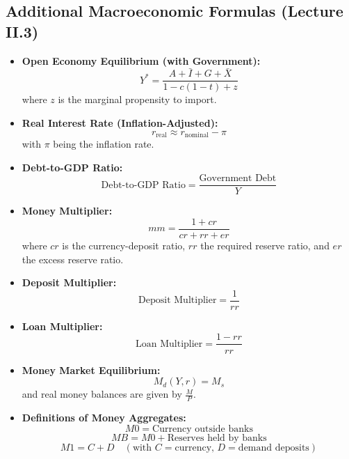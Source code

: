 \subsection*{Additional Macroeconomic Formulas (Lecture II.3)}
\begin{itemize}
    \item \textbf{Open Economy Equilibrium (with Government):}
    \[
    Y^* = \frac{A + \bar{I} + G + \bar{X}}{1 - c(1-t) + z}
    \]
    where \(z\) is the marginal propensity to import.
    \item \textbf{Real Interest Rate (Inflation-Adjusted):}
    \[
    r_{\text{real}} \approx r_{\text{nominal}} - \pi
    \]
    with \(\pi\) being the inflation rate.
    \item \textbf{Debt-to-GDP Ratio:}
    \[
    \text{Debt-to-GDP Ratio} = \frac{\text{Government Debt}}{Y}
    \]
    \item \textbf{Money Multiplier:}
    \[
    mm = \frac{1 + cr}{cr + rr + er}
    \]
    where \(cr\) is the currency-deposit ratio, \(rr\) the required reserve ratio, and \(er\) the excess reserve ratio.
    \item \textbf{Deposit Multiplier:}
    \[
    \text{Deposit Multiplier} = \frac{1}{rr}
    \]
    \item \textbf{Loan Multiplier:}
    \[
    \text{Loan Multiplier} = \frac{1 - rr}{rr}
    \]
    \item \textbf{Money Market Equilibrium:}
    \[
    M_d(Y, r) = M_s
    \]
    and real money balances are given by \(\frac{M}{P}\).
    \item \textbf{Definitions of Money Aggregates:}
    \[
    M0 = \text{Currency outside banks}
    \]
    \[
    MB = M0 + \text{Reserves held by banks}
    \]
    \[
    M1 = C + D \quad (\text{with } C=\text{currency},\, D=\text{demand deposits})
    \]
\end{itemize}

